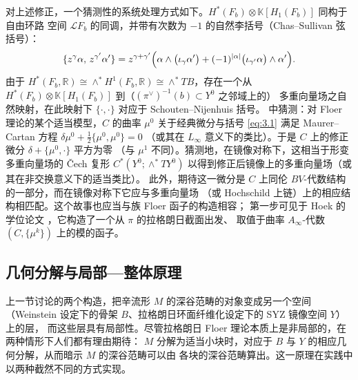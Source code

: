\documentclass[UTF8,a4paper,11pt,fontset=windows]{ctexart}
\theoremstyle{cnthm}
\numberwithin{equation}{section}
\newcommand{\R}{\mathbb{R}}
\newcommand{\KK}{\mathbb{K}}          %
\begin{document}
对上述修正，一个猜测性的系统处理方式如下。$H^{*}(F_b)\otimes\KK[H_1(F_b)]$ 同构于自由环路
空间 $\mathcal{L}F_b$ 的同调，并带有次数为 $-1$ 的自然李括号（Chas--Sullivan 弦括号）：
\begin{equation}\label{eq:3.1}
\{z^{\gamma}\alpha,\,z^{\gamma'}\alpha'\}
=z^{\gamma+\gamma'}\Bigl(\alpha\wedge\bigl(\iota_{\gamma}\alpha'\bigr)
+(-1)^{|\alpha|}\bigl(\iota_{\gamma'}\alpha\bigr)\wedge\alpha'\Bigr).
\end{equation}
由于 $H^{*}(F_b,\R)\cong\wedge^{*}H^{1}(F_b,\R)\cong\wedge^{*}TB$，存在一个从
$H^{*}(F_b)\otimes\KK[H_1(F_b)]$ 到（$(\pi^{\vee})^{-1}(b)\subset Y^{0}$ 之邻域上的）
多重向量场之自然映射，在此映射下 $\{\cdot,\cdot\}$ 对应于 Schouten--Nijenhuis 括号。
\cite{r24} 中猜测：对 Floer 理论的某个适当模型，$C$ 的曲率 $\mu^{0}$ 关于经典微分与括号
\eqref{eq:3.1} 满足 Maurer--Cartan 方程 $\delta\mu^{0}+\frac12\{\mu^{0},\mu^{0}\}=0$
（或其在 $L_\infty$ 意义下的类比）。于是 $C$ 上的修正微分 $\delta+\{\mu^{0},\cdot\}$ 平方为零
（与 $\mu^{1}$ 不同）。猜测地，在镜像对称下，这相当于形变多重向量场的 \v{C}ech 复形
$C^{*}(Y^{0};\wedge^{*}TY^{0})$ 以得到修正后镜像上的多重向量场（或其在非交换意义下的适当类比）。
此外，期待这一微分是 $C$ 上同伦 $BV$-代数结构的一部分，而在镜像对称下它应与多重向量场
（或 Hochschild 上链）上的相应结构相匹配。这个故事也应当与族 Floer 函子的构造相容；
第一步可见于 Hoek 的学位论文 \cite{r63}，它构造了一个从 $\pi$ 的拉格朗日截面出发、
取值于曲率 $A_\infty$-代数 $(C,\{\mu^{k}\})$ 上的模的函子。


\subsection{几何分解与局部—整体原理}\label{sec:3.2}

上一节讨论的两个构造，把辛流形 $M$ 的深谷范畴的对象变成另一个空间
（Weinstein 设定下的骨架 $B$、拉格朗日环面纤维化设定下的 SYZ 镜像空间 $Y$）上的层，
而这些层具有局部性。尽管拉格朗日 Floer 理论本质上是非局部的，在两种情形下人们都有理由期待：
$M$ 分解为适当小块时，对应于 $B$ 与 $Y$ 的相应几何分解，从而暗示 $M$ 的深谷范畴可以由
各块的深谷范畴算出。这一原理在实践中以两种截然不同的方式实现。
\end{document}

